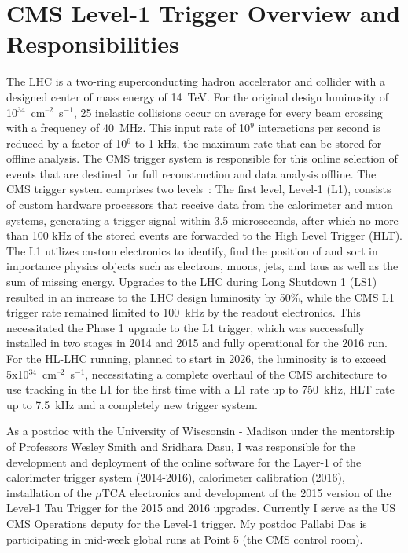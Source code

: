 \documentclass[preprint,12pt]{elsarticle}
\begin{document}
\section{CMS Level-1 Trigger Overview and Responsibilities}
The LHC is a two-ring superconducting hadron accelerator and collider with a designed center 
of mass energy of 14~TeV. For the original design luminosity of 10$^{34}$~cm$^{–2}$~s$^{-1}$,
25 inelastic collisions occur on average for every beam crossing with a frequency of 40~MHz.
This input rate of 10$^9$ interactions per second is reduced by a factor of 10$^6$ to 1 kHz,
the maximum rate that can be stored for offline analysis. 
The CMS trigger system is responsible for this online selection of events that are destined for full 
reconstruction and data analysis offline. The CMS trigger system comprises two levels~\cite{Khachatryan:2016bia}: 
The first level, Level-1 (L1), consists of custom hardware processors that receive data from the calorimeter and muon 
systems, generating a trigger signal within 3.5 microseconds, after which
no more than 100 kHz of the stored events are forwarded to the High Level Trigger (HLT). The L1 utilizes
custom electronics to identify, find the position of and sort in importance physics objects such as
electrons, muons, jets, and taus as well as the sum of missing energy. Upgrades to the LHC during Long Shutdown 1 (LS1)
resulted in an increase to the LHC design luminosity by 50\%, while the CMS L1 trigger rate
remained limited to 100~kHz by the readout electronics. This necessitated the Phase 1 upgrade 
to the L1 trigger,
which was successfully installed in two stages in 2014 and 2015 and fully operational for 
the 2016 run. For the
HL-LHC running, planned to start in 2026, the luminosity is to exceed 5x10$^{34}$~cm$^{–2}$~s$^{-1}$,
necessitating a complete overhaul of the CMS architecture to use tracking in the L1 for the first time
with a L1 rate up to 750~kHz, HLT rate up to 7.5~kHz and a completely new trigger system.

As a postdoc with the University of Wiscsonsin - Madison under the mentorship of Professors Wesley Smith
and Sridhara Dasu, I was responsible for the development and deployment of the online software for the 
Layer-1 of the calorimeter trigger system (2014-2016), calorimeter calibration (2016), installation of 
the $\mu$TCA electronics and development of the 2015 version of the Level-1 Tau Trigger for the 2015 and 2016 
upgrades. Currently I serve as the US CMS Operations deputy for the Level-1 trigger. My postdoc
Pallabi Das is participating in mid-week global runs at Point 5 (the CMS control room).  
\end{document}
